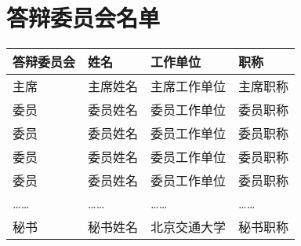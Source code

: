 \null\texttt{}\relax



\ifdoctor
\chapter*{答辩委员会名单}

\begin{table}[H]
\centering
\renewcommand{\arraystretch}{2.55} %

\begin{tabular}{|>{\centering\arraybackslash\xiaosi }m{2.2cm}|
                >{\centering\arraybackslash\xiaosi }m{2.5cm}|
                >{\centering\arraybackslash\xiaosi }m{5.6cm}|
                >{\centering\arraybackslash\xiaosi }m{3.1cm}|}
  \hline
  \textbf{答辩委员会} & \textbf{姓名} & \textbf{工作单位} & \textbf{职称} \\
  \hline
  主席 & 主席姓名 & 主席工作单位 & 主席职称 \\
  \hline
  委员 & 委员姓名 & 委员工作单位 & 委员职称 \\
  \hline
  委员 & 委员姓名 & 委员工作单位 & 委员职称 \\
  \hline
  委员 & 委员姓名 & 委员工作单位 & 委员职称 \\
  \hline
  委员 & 委员姓名 & 委员工作单位 & 委员职称 \\
  \hline
  …… & …… & …… & …… \\
  \hline
  秘书 & 秘书姓名 & 北京交通大学 & 秘书职称 \\
  \hline
\end{tabular}
\end{table}

\fi